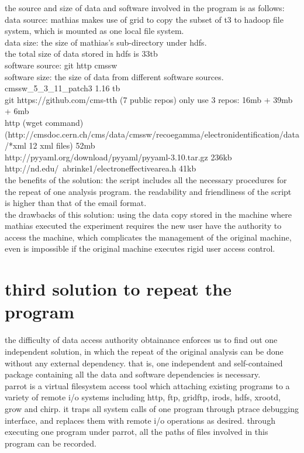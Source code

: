 \documentclass{article}
\begin{document}
the source and size of data and software involved in the program is as follows:\\
data source: mathias makes use of grid to copy the subset of t3 to hadoop file system, which is mounted as one local file system.\\
data size: the size of mathias’s sub-directory under hdfs.\\
the total size of data stored in hdfs is 33tb\\
software source: git http cmssw\\
software size: the size of data from different software sources.\\
cmssw\_5\_3\_11\_patch3          1.16 tb\\
git https://github.com/cms-tth (7 public repos)   only use 3 repos: 16mb + 39mb + 6mb\\
http (wget command)\\
(http://cmsdoc.cern.ch/cms/data/cmssw/recoegamma/electronidentification/data/*xml  12 xml files)  52mb\\
http://pyyaml.org/download/pyyaml/pyyaml-3.10.tar.gz    236kb\\
http://nd.edu/~abrinke1/electroneffectivearea.h      41kb\\
the benefits of the solution: the script includes all the necessary procedures for the repeat of one analysis program. the readability and friendliness of the script is higher than that of the email format.\\

the drawbacks of this solution: using the data copy stored in the machine where mathias executed the experiment requires the new user have the authority to access the machine, which complicates the management of the original machine, even is impossible if the original machine executes rigid user access control.\\

\section{third solution to repeat the program}
the difficulty of data access authority obtainance enforces us to find out one independent solution, in which the repeat of the original analysis can be done without any external dependency. that is, one independent and self-contained package containing all the data and software dependencies is necessary.\\

parrot is a virtual filesystem access tool which attaching existing programs to a variety of remote i/o systems including http, ftp, gridftp, irods, hdfs, xrootd, grow and chirp. it traps all system calls of one program through ptrace debugging interface, and replaces them with remote i/o operations as desired. through executing one program under parrot, all the paths of files involved in this program can be recorded.\\
\end{document}
